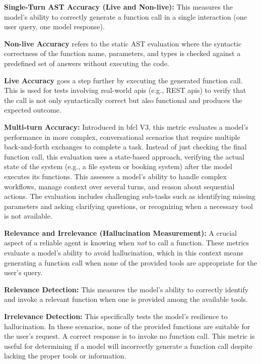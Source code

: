 \begin{compactitem}[\textbullet]
    \item \textbf{Single-Turn AST Accuracy (Live and Non-live):} This measures the model's ability to correctly generate a function call in a single interaction (one user query, one model response).
    \begin{compactitem}[$\circ$]
        \item \textbf{Non-live Accuracy} refers to the static AST evaluation where the syntactic correctness of the function name, parameters, and types is checked against a predefined set of answers without executing the code.
        \item \textbf{Live Accuracy} goes a step further by executing the generated function call. This is used for tests involving real-world \acp{api} (e.g., REST \acp{api}) to verify that the call is not only syntactically correct but also functional and produces the expected outcome.
    \end{compactitem}

    \item \textbf{Multi-turn Accuracy:} Introduced in \ac{bfcl} V3, this metric evaluates a model's performance in more complex, conversational scenarios that require multiple back-and-forth exchanges to complete a task. Instead of just checking the final function call, this evaluation uses a state-based approach, verifying the actual state of the system (e.g., a file system or booking system) after the model executes its functions. This assesses a model's ability to handle complex workflows, manage context over several turns, and reason about sequential actions. The evaluation includes challenging sub-tasks such as identifying missing parameters and asking clarifying questions, or recognizing when a necessary tool is not available.

    \item \textbf{Relevance and Irrelevance (Hallucination Measurement):} A crucial aspect of a reliable agent is knowing when \textit{not} to call a function. These metrics evaluate a model's ability to avoid hallucination, which in this context means generating a function call when none of the provided tools are appropriate for the user's query.
    \begin{compactitem}[$\circ$]
        \item \textbf{Relevance Detection:} This measures the model's ability to correctly identify and invoke a relevant function when one is provided among the available tools.
        \item \textbf{Irrelevance Detection:} This specifically tests the model's resilience to hallucination. In these scenarios, none of the provided functions are suitable for the user's request. A correct response is to invoke no function call. This metric is useful for determining if a model will incorrectly generate a function call despite lacking the proper tools or information.
    \end{compactitem}
\end{compactitem}

